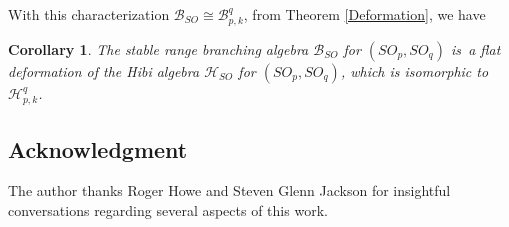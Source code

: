 \documentclass[11pt]{amsart}
\numberwithin{equation}{subsection}
\newtheorem{corollary}[theorem]{Corollary}
\begin{document}
With this characterization $\mathcal{B}_{{SO}} \cong \mathcal{B}_{p,k}^q$, 
from Theorem \ref{Deformation}, we have

\begin{corollary}
The stable range branching algebra $\mathcal{B}_{{SO}}$ for 
$({SO}_{p},{SO}_{q})$ is\ a flat deformation of the Hibi algebra 
$\mathcal{H}_{SO}$ for $({SO}_{p},{SO}_{q})$, which is isomorphic to $\mathcal{H}_{p,k}^q$.
\end{corollary}

\medskip

\subsection*{Acknowledgment} 
The author thanks Roger Howe and Steven Glenn Jackson 
for insightful conversations regarding several aspects of this work.
\end{document}
